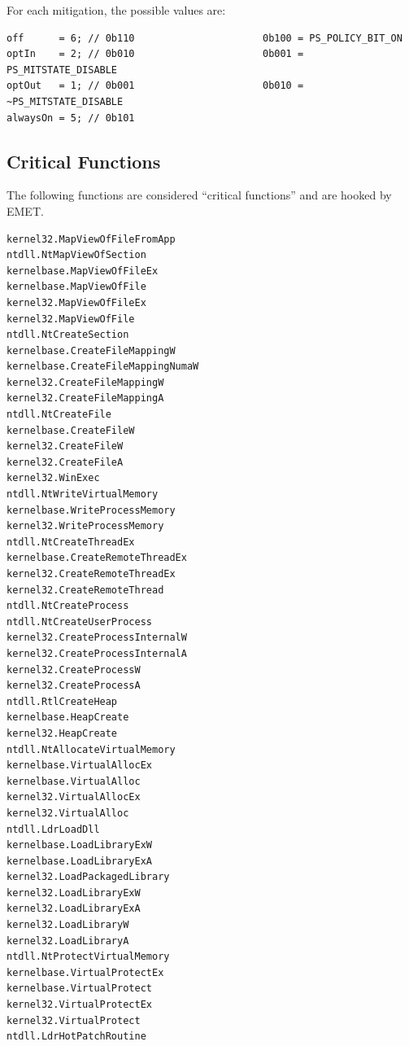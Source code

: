 \documentclass[]{article}
\begin{document}
For each mitigation, the possible values are:

\begin{verbatim}
off      = 6; // 0b110                      0b100 = PS_POLICY_BIT_ON
optIn    = 2; // 0b010                      0b001 = PS_MITSTATE_DISABLE
optOut   = 1; // 0b001                      0b010 = ~PS_MITSTATE_DISABLE
alwaysOn = 5; // 0b101
\end{verbatim}

\subsection{Critical Functions}\label{critical_functions}
The following functions are considered ``critical functions'' and are hooked by EMET.

\begin{verbatim}
kernel32.MapViewOfFileFromApp
ntdll.NtMapViewOfSection
kernelbase.MapViewOfFileEx
kernelbase.MapViewOfFile
kernel32.MapViewOfFileEx
kernel32.MapViewOfFile
ntdll.NtCreateSection
kernelbase.CreateFileMappingW
kernelbase.CreateFileMappingNumaW
kernel32.CreateFileMappingW
kernel32.CreateFileMappingA
ntdll.NtCreateFile
kernelbase.CreateFileW
kernel32.CreateFileW
kernel32.CreateFileA
kernel32.WinExec
ntdll.NtWriteVirtualMemory
kernelbase.WriteProcessMemory
kernel32.WriteProcessMemory
ntdll.NtCreateThreadEx
kernelbase.CreateRemoteThreadEx
kernel32.CreateRemoteThreadEx
kernel32.CreateRemoteThread
ntdll.NtCreateProcess
ntdll.NtCreateUserProcess
kernel32.CreateProcessInternalW
kernel32.CreateProcessInternalA
kernel32.CreateProcessW
kernel32.CreateProcessA
ntdll.RtlCreateHeap
kernelbase.HeapCreate
kernel32.HeapCreate
ntdll.NtAllocateVirtualMemory
kernelbase.VirtualAllocEx
kernelbase.VirtualAlloc
kernel32.VirtualAllocEx
kernel32.VirtualAlloc
ntdll.LdrLoadDll
kernelbase.LoadLibraryExW
kernelbase.LoadLibraryExA
kernel32.LoadPackagedLibrary
kernel32.LoadLibraryExW
kernel32.LoadLibraryExA
kernel32.LoadLibraryW
kernel32.LoadLibraryA
ntdll.NtProtectVirtualMemory
kernelbase.VirtualProtectEx
kernelbase.VirtualProtect
kernel32.VirtualProtectEx
kernel32.VirtualProtect
ntdll.LdrHotPatchRoutine
\end{verbatim}

 \clearpage

\end{document}
